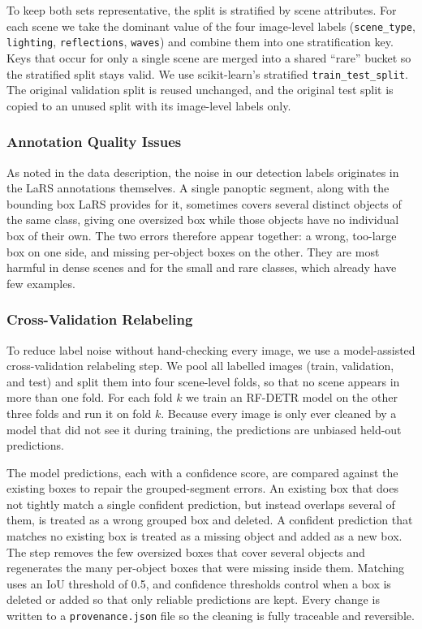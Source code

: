 \documentclass[11pt,a4paper]{article}
\begin{document}
To keep both sets representative, the split is stratified by scene attributes.
For each scene we take the dominant value of the four image-level labels
(\texttt{scene\_type}, \texttt{lighting}, \texttt{reflections}, \texttt{waves})
and combine them into one stratification key. Keys that occur for only a single
scene are merged into a shared ``rare'' bucket so the stratified split stays
valid. We use scikit-learn's stratified \texttt{train\_test\_split}. The original validation split is reused
unchanged, and the original test split is copied to an unused split with its
image-level labels only.

\subsubsection{Annotation Quality Issues}
As noted in the data description, the noise in our detection labels originates in the LaRS annotations themselves. A single panoptic segment, along with the bounding box LaRS provides for it, sometimes covers several distinct objects of the same class, giving one oversized box while those objects have no individual box of their own. The two errors therefore appear together: a wrong, too-large box on one side, and missing per-object boxes on the other. They are most harmful in dense scenes and for the small and rare classes, which already have few examples.

\subsubsection{Cross-Validation Relabeling}
\label{sec:relabel}
To reduce label noise without hand-checking every image, we use a model-assisted
cross-validation relabeling step. We pool all labelled images (train, validation,
and test) and split them into four scene-level folds, so that no scene appears in
more than one fold. For each fold $k$ we train an RF-DETR model on the other three
folds and run it on fold $k$. Because every image is only ever cleaned by a model
that did not see it during training, the predictions are unbiased held-out
predictions.

The model predictions, each with a confidence score, are compared against the
existing boxes to repair the grouped-segment errors. An existing box that does
not tightly match a single confident prediction, but instead overlaps several of
them, is treated as a wrong grouped box and deleted. A confident prediction that
matches no existing box is treated as a missing object and added as a new box.
The step removes the few oversized boxes that cover several objects and
regenerates the many per-object boxes that were missing inside them. Matching
uses an IoU threshold of 0.5, and confidence thresholds control when a box is
deleted or added so that only reliable predictions are kept. Every change is
written to a \texttt{provenance.json} file so the cleaning is fully traceable and
reversible.
\end{document}
